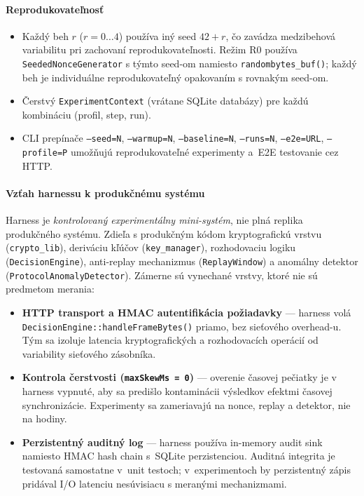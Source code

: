 \paragraph{Reprodukovateľnosť}

\begin{itemize}[leftmargin=*,itemsep=2pt]
  \item Každý beh $r$ ($r = 0\ldots4$) používa iný seed $42 + r$, čo zavádza medzibehová variabilitu pri zachovaní reprodukovateľnosti. Režim R0 používa \texttt{SeededNonceGenerator} s týmto seed-om namiesto \texttt{randombytes\_buf()}; každý beh je individuálne reprodukovateľný opakovaním s rovnakým seed-om.
  \item Čerstvý \texttt{ExperimentContext} (vrátane SQLite databázy) pre každú kombináciu (profil, step, run).
  \item CLI prepínače \texttt{--seed=N}, \texttt{--warmup=N}, \texttt{--baseline=N}, \texttt{--runs=N}, \texttt{--e2e=URL}, \texttt{--profile=P} umožňujú reprodukovateľné experimenty a~E2E testovanie cez HTTP.
\end{itemize}

\paragraph{Vzťah harnessu k produkčnému systému}

Harness je \emph{kontrolovaný experimentálny mini-systém}, nie plná replika produkčného systému. Zdieľa s produkčným kódom kryptografickú vrstvu (\texttt{crypto\_lib}), deriváciu kľúčov (\texttt{key\_manager}), rozhodovaciu logiku (\texttt{DecisionEngine}), anti-replay mechanizmus (\texttt{ReplayWindow}) a anomálny detektor (\texttt{ProtocolAnomalyDetector}). Zámerne sú vynechané vrstvy, ktoré nie sú predmetom merania:

\begin{itemize}[leftmargin=*,itemsep=2pt]
  \item \textbf{HTTP transport a HMAC autentifikácia požiadavky} --- harness volá \texttt{DecisionEngine::handleFrameBytes()} priamo, bez sieťového overhead-u. Tým sa izoluje latencia kryptografických a rozhodovacích operácií od variability sieťového zásobníka.
  \item \textbf{Kontrola čerstvosti (\texttt{maxSkewMs = 0})} --- overenie časovej pečiatky je v harness vypnuté, aby sa predišlo kontaminácii výsledkov efektmi časovej synchronizácie. Experimenty sa zameriavajú na nonce, replay a detektor, nie na hodiny.
  \item \textbf{Perzistentný auditný log} --- harness používa in-memory audit sink namiesto HMAC hash chain s~SQLite perzistenciou. Auditná integrita je testovaná samostatne v~unit testoch; v~experimentoch by perzistentný zápis pridával I/O latenciu nesúvisiacu s meranými mechanizmami.
\end{itemize}


